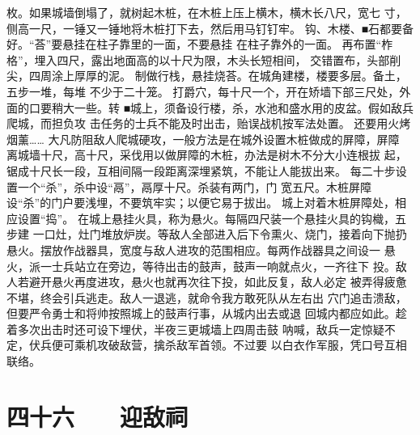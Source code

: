 \documentclass[12pt,UTF8]{ctexbook}
\begin{document}
枚。如果城墙倒塌了，就树起木桩，在木桩上压上横木，横木长八尺，宽七 
寸，侧高一尺，一锤又一锤地将木桩打下去，然后用马钉钉牢。 
钩、木楼、■石都要备好。“荅”要悬挂在柱子靠里的一面，不要悬挂 
在柱子靠外的一面。 
再布置“柞格”，埋入四尺，露出地面高的以十尺为限，木头长短相间， 
交错置布，头部削尖，四周涂上厚厚的泥。 
制做行栈，悬挂烧荅。在城角建楼，楼要多层。备土，五步一堆，每堆 
不少于二十笼。 
打爵穴，每十尺一个，开在矫墙下部三尺处，外面的口要稍大一些。转 
■城上，须备设行楼，杀，水池和盛水用的皮盆。假如敌兵爬城，而担负攻 
击任务的士兵不能及时出击，贻误战机按军法处置。 
还要用火烤烟薰…… 
大凡防阻敌人爬城硬攻，一般方法是在城外设置木桩做成的屏障，屏障 
离城墙十尺，高十尺，采伐用以做屏障的木桩，办法是树木不分大小连根拔 
起，锯成十尺长一段，互相间隔一段距离深埋紧筑，不能让人能拔出来。 
每二十步设置一个“杀”，杀中设“鬲”，鬲厚十尺。杀装有两门，门 
宽五尺。木桩屏障设“杀”的门户要浅埋，不要筑牢实；以便它易于拔出。 
城上对着木桩屏障处，相应设置“捣”。 
在城上悬挂火具，称为悬火。每隔四尺装一个悬挂火具的钩樴，五步建 
一口灶，灶门堆放炉炭。等敌人全部进入后下令熏火、烧门，接着向下抛扔 
悬火。摆放作战器具，宽度与敌人进攻的范围相应。每两作战器具之间设一 
悬火，派一士兵站立在旁边，等待出击的鼓声，鼓声一响就点火，一齐往下 
投。敌人若避开悬火再度进攻，悬火也就再次往下投，如此反复，敌人必定 
被弄得疲惫不堪，终会引兵逃走。敌人一退逃，就命令我方敢死队从左右出 
穴门追击溃敌，但要严令勇士和将帅按照城上的鼓声行事，从城内出去或退 
回城内都应如此。趁着多次出击时还可设下埋伏，半夜三更城墙上四周击鼓 
呐喊，敌兵一定惊疑不定，伏兵便可乘机攻破敌营，擒杀敌军首领。不过要 
以白衣作军服，凭口号互相联络。 


\chapter{四十六　　迎敌祠}
\end{document}
